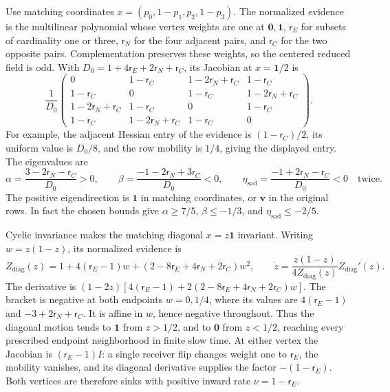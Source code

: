 Use matching coordinates
\(x=(p_0,1-p_1,p_2,1-p_3)\). The normalized evidence is the
multilinear polynomial whose vertex weights are one at \(\mathbf0,\mathbf1\),
\(\mathsf r_E\) for subsets of cardinality one or three, \(\mathsf r_N\) for the four adjacent
pairs, and \(\mathsf r_C\) for the two opposite pairs. Complementation preserves
these weights, so the centered reduced field is odd. With
\(D_0=1+4\mathsf r_E+2\mathsf r_N+\mathsf r_C\), its Jacobian at \(x=\mathbf1/2\) is
\[
 \frac1{D_0}
 \begin{pmatrix}
 0&1-\mathsf r_C&1-2\mathsf r_N+\mathsf r_C&1-\mathsf r_C\\
 1-\mathsf r_C&0&1-\mathsf r_C&1-2\mathsf r_N+\mathsf r_C\\
 1-2\mathsf r_N+\mathsf r_C&1-\mathsf r_C&0&1-\mathsf r_C\\
 1-\mathsf r_C&1-2\mathsf r_N+\mathsf r_C&1-\mathsf r_C&0
 \end{pmatrix}.
\]
For example, the adjacent Hessian entry of the evidence is
\((1-\mathsf r_C)/2\), its uniform value is \(D_0/8\), and the row mobility is
\(1/4\), giving the displayed entry. The eigenvalues are
\begin{equation}
 \alpha=\frac{3-2\mathsf r_N-\mathsf r_C}{D_0}>0,\qquad
 \beta=\frac{-1-2\mathsf r_N+3\mathsf r_C}{D_0}<0,\qquad
 \eta_{\mathrm{sad}}=\frac{-1+2\mathsf r_N-\mathsf r_C}{D_0}<0\quad\text{twice}.
\label{eq:phil-selection-saddle-spectrum}
\end{equation}
The positive eigendirection is \(\mathbf1\) in matching coordinates,
or \(\mathbf v\) in the original rows. In fact the chosen bounds give
\(\alpha\ge7/5\), \(\beta\le-1/3\), and \(\eta_{\mathrm{sad}}\le-2/5\).

Cyclic invariance makes the matching diagonal \(x=z\mathbf1\) invariant.
Writing \(w=z(1-z)\), its normalized evidence is
\[
 Z_{\mathrm{diag}}(z)
 =1+4(\mathsf r_E-1)w+(2-8\mathsf r_E+4\mathsf r_N+2\mathsf r_C)w^2,
 \qquad
 \dot z=\frac{z(1-z)}{4Z_{\mathrm{diag}}(z)}Z_{\mathrm{diag}}'(z).
\]
The derivative is \((1-2z)[4(\mathsf r_E-1)+2(2-8\mathsf r_E+4\mathsf r_N+2\mathsf r_C)w]\).
The bracket is negative at both endpoints \(w=0,1/4\), where its values
are \(4(\mathsf r_E-1)\) and \(-3+2\mathsf r_N+\mathsf r_C\). It is affine in \(w\), hence negative
throughout. Thus the diagonal motion tends to \(\mathbf1\) from
\(z>1/2\), and to \(\mathbf0\) from \(z<1/2\), reaching every prescribed
endpoint neighborhood in finite slow time. At either vertex the Jacobian
is \((\mathsf r_E-1)I\): a single receiver flip changes weight one to \(\mathsf r_E\), the
mobility vanishes, and its diagonal derivative supplies the factor
\(-(1-\mathsf r_E)\). Both vertices are therefore sinks with positive inward rate
\(\nu=1-\mathsf r_E\).

